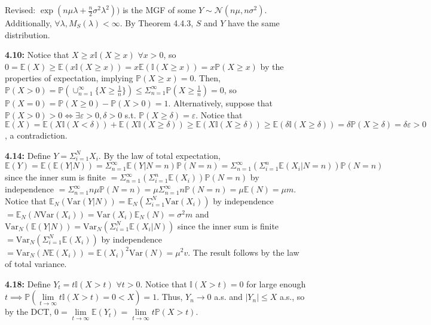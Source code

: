 \documentclass[12pt]{article}
\newcommand{\E}{\mathbb{E}}
\newcommand{\I}{\mathbb{I}}
\newcommand{\p}{\mathbb{P}}
\newcommand{\V}{\text{Var}}
\begin{document}
Revised: $\exp(n\mu\lambda + \frac{n}{2}\sigma^2\lambda^2))$ is the MGF of some $Y \sim \mathcal{N}(n\mu, n\sigma^2)$. Additionally, $\forall \lambda, M_S(\lambda) < \infty$. By Theorem 4.4.3, $S$ and $Y$ have the same distribution.

\textbf{4.10:} Notice that $X \geq x\I(X \geq x)$ $\forall x > 0$, so $0 = \E(X) \geq \E(x\I(X \geq x)) = x\E(\I(X \geq x)) = x\p(X \geq x)$ by the properties of expectation, implying $\p(X \geq x) = 0$. Then, $\p(X > 0) = \p(\cup_{n=1}^\infty \{X \geq \frac{1}{n}\}) \leq \Sigma_{n=1}^\infty \p(X \geq \frac{1}{n}) = 0$, so $\p(X = 0) = \p(X \geq 0) - \p(X > 0) = 1$. Alternatively, suppose that $\p(X > 0) > 0 \iff \exists \varepsilon > 0, \delta > 0$ s.t. $\p(X \geq \delta) = \varepsilon$. Notice that $\E(X) = \E(X\mathbb{I}(X < \delta)) + \E(X\mathbb{I}(X \geq \delta)) \geq \E(X\mathbb{I}(X \geq \delta)) \geq \E(\delta \mathbb{I}(X \geq \delta)) = \delta \p(X \geq \delta) = \delta \varepsilon > 0$, a contradiction.

\textbf{4.14:} Define $Y = \Sigma_{i=1}^N X_i$. By the law of total expectation, $\E(Y) = \E(\E(Y|N)) = \Sigma_{n=1}^\infty \E(Y|N = n)\p(N = n) = \Sigma_{n=1}^\infty (\Sigma_{i=1}^n \E(X_i|N = n))\p(N = n)$ since the inner sum is finite $= \Sigma_{n=1}^\infty (\Sigma_{i=1}^n \E(X_i))\p(N = n)$ by independence $= \Sigma_{n=1}^\infty n\mu\p(N=n) = \mu \Sigma_{n=1}^\infty n\p(N=n) = \mu\E(N) = \mu m$. Notice that $\E_N(\V(Y|N)) = \E_N(\Sigma_{i=1}^N \V(X_i))$ by independence $= \E_N(N\V(X_i)) = \V(X_i)\E_N(N) = \sigma^2 m$ and $\V_N(\E(Y|N)) = \V_N(\Sigma_{i=1}^N \E(X_i|N))$ since the inner sum is finite $= \V_N(\Sigma_{i=1}^N \E(X_i))$ by independence $= \V_N(N\E(X_i)) = \E(X_i)^2\V(N) = \mu^2 v$. The result follows by the law of total variance.

\textbf{4.18:} Define $Y_t = t\I(X > t)$ $\forall t > 0$. Notice that $\I(X > t) = 0$ for large enough $t \implies \p(\lim \limits_{t \to \infty} t\I(X > t) = 0 < X) = 1$. Thus, $Y_n \to 0$ a.s. and $|Y_n| \leq X$ a.s., so by the DCT, $0 = \lim \limits_{t \to \infty} \E(Y_t) = \lim \limits_{t \to \infty} t\p(X > t)$.
\end{document}
